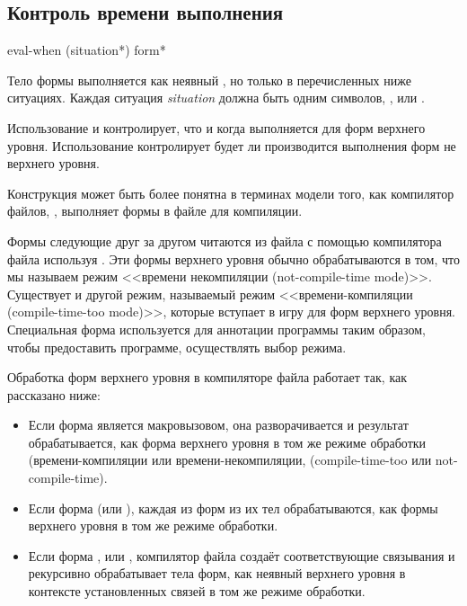 \subsection{Контроль времени выполнения}

\begin{defspec}
eval-when ({situation}*) {form}*

Тело формы  выполняется как неявный , но только в
перечисленных ниже ситуациях. Каждая ситуация \emph{situation} должна быть
одним символов, ,  или .

Использование  и  контролирует, что и
когда выполняется для форм верхнего уровня. Использование 
контролирует будет ли производится выполнения форм не верхнего уровня.

Конструкция  может быть более понятна в терминах модели того,
как компилятор файлов, , выполняет формы в файле для
компиляции.

Формы следующие друг за другом читаются из файла с помощью компилятора файла
используя . Эти формы верхнего уровня обычно обрабатываются в том,
что мы называем режим <<времени некомпиляции (not-compile-time
mode)>>. Существует и другой режим, называемый режим <<времени-компиляции
(compile-time-too mode)>>, которые вступает в игру для форм верхнего
уровня. Специальная форма  используется для аннотации программы
таким образом, чтобы предоставить программе, осуществлять выбор режима.

Обработка форм верхнего уровня в компиляторе файла работает так, как
рассказано ниже:

\begin{itemize}

\item Если форма является макровызовом, она разворачивается и результат
  обрабатывается, как форма верхнего уровня в том же режиме обработки
  (времени-компиляции или времени-некомпиляции, (compile-time-too или not-compile-time).

\item Если форма  (или ), каждая из форм из их тел
  обрабатываются, как формы верхнего уровня в том же режиме обработки.

\item Если форма ,  или
  , компилятор файла создаёт соответствующие связывания и
  рекурсивно обрабатывает тела форм, как неявный  верхнего уровня
  в контексте установленных связей в том же режиме обработки.


\end{itemize}
\end{defspec}
